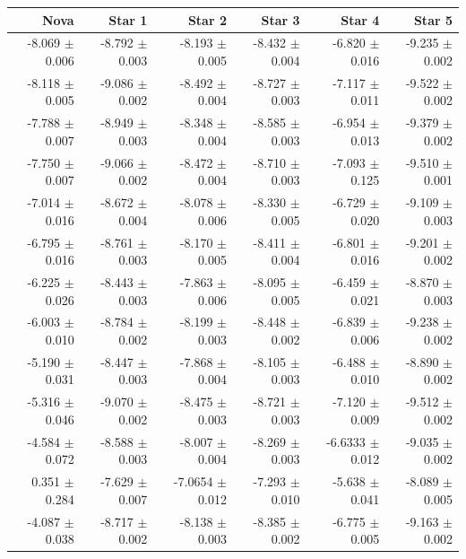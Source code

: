 \documentclass{tda}
\begin{document}
	\begin{table}
		\centering
		\begin{tabular} {r r r r r r}
			\toprule
			\textbf{Nova} & \textbf{Star 1} & \textbf{Star 2} & \textbf{Star 3} & \textbf{Star 4} & \textbf{Star 5} \\
			\midrule
			-8.069 \(\pm\) 0.006 & -8.792 \(\pm\) 0.003 & -8.193 \(\pm\) 0.005 & -8.432 \(\pm\) 0.004 & -6.820 \(\pm\) 0.016 & -9.235 \(\pm\) 0.002 \\
			-8.118 \(\pm\) 0.005 & -9.086 \(\pm\) 0.002 & -8.492 \(\pm\) 0.004 & -8.727 \(\pm\) 0.003 & -7.117 \(\pm\) 0.011 & -9.522 \(\pm\) 0.002 \\
			-7.788 \(\pm\) 0.007 & -8.949 \(\pm\) 0.003 & -8.348 \(\pm\) 0.004 & -8.585 \(\pm\) 0.003 & -6.954 \(\pm\) 0.013 & -9.379 \(\pm\) 0.002 \\
			-7.750 \(\pm\) 0.007 & -9.066 \(\pm\) 0.002 & -8.472 \(\pm\) 0.004 & -8.710 \(\pm\) 0.003 & -7.093 \(\pm\) 0.125 & -9.510 \(\pm\) 0.001 \\
			-7.014 \(\pm\) 0.016 & -8.672 \(\pm\) 0.004 & -8.078 \(\pm\) 0.006 & -8.330 \(\pm\) 0.005 & -6.729 \(\pm\) 0.020 & -9.109 \(\pm\) 0.003 \\
			-6.795 \(\pm\) 0.016 & -8.761 \(\pm\) 0.003 & -8.170 \(\pm\) 0.005 & -8.411 \(\pm\) 0.004 & -6.801 \(\pm\) 0.016 & -9.201 \(\pm\) 0.002 \\
			-6.225 \(\pm\) 0.026 & -8.443 \(\pm\) 0.003 & -7.863 \(\pm\) 0.006 & -8.095 \(\pm\) 0.005 & -6.459 \(\pm\) 0.021 & -8.870 \(\pm\) 0.003 \\
			-6.003 \(\pm\) 0.010 & -8.784 \(\pm\) 0.002 & -8.199 \(\pm\) 0.003 & -8.448 \(\pm\) 0.002 & -6.839 \(\pm\) 0.006 & -9.238 \(\pm\) 0.002 \\
			-5.190 \(\pm\) 0.031 & -8.447 \(\pm\) 0.003 & -7.868 \(\pm\) 0.004 & -8.105 \(\pm\) 0.003 & -6.488 \(\pm\) 0.010 & -8.890 \(\pm\) 0.002 \\
			-5.316 \(\pm\) 0.046 & -9.070 \(\pm\) 0.002 & -8.475 \(\pm\) 0.003 & -8.721 \(\pm\) 0.003 & -7.120 \(\pm\) 0.009 & -9.512 \(\pm\) 0.002 \\
			-4.584 \(\pm\) 0.072 & -8.588 \(\pm\) 0.003 & -8.007 \(\pm\) 0.004 & -8.269 \(\pm\) 0.003 & -6.6333 \(\pm\) 0.012 & -9.035 \(\pm\) 0.002 \\
			0.351 \(\pm\) 0.284 & -7.629 \(\pm\) 0.007 & -7.0654 \(\pm\) 0.012 & -7.293 \(\pm\) 0.010 & -5.638 \(\pm\) 0.041 & -8.089 \(\pm\) 0.005 \\
			-4.087 \(\pm\) 0.038 & -8.717 \(\pm\) 0.002 & -8.138 \(\pm\) 0.003 & -8.385 \(\pm\) 0.002 & -6.775 \(\pm\) 0.005 & -9.163 \(\pm\) 0.002 \\

\end{tabular}
\end{table}
\end{document}
